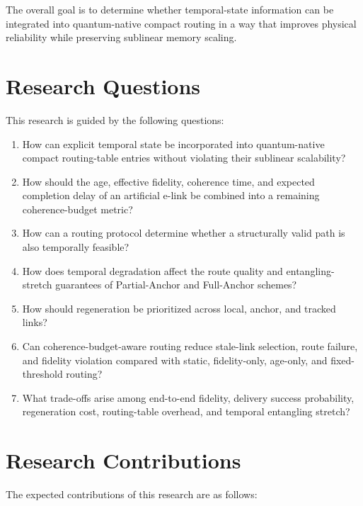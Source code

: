 The overall goal is to determine whether temporal-state information can be integrated into quantum-native compact routing in a way that improves physical reliability while preserving sublinear memory scaling.
\section{Research Questions}
This research is guided by the following questions:

\begin{enumerate}
    \item How can explicit temporal state be incorporated into quantum-native compact routing-table entries without violating their sublinear scalability?

    \item How should the age, effective fidelity, coherence time, and expected completion delay of an artificial e-link be combined into a remaining coherence-budget metric?

    \item How can a routing protocol determine whether a structurally valid path is also temporally feasible?

    \item How does temporal degradation affect the route quality and entangling-stretch guarantees of Partial-Anchor and Full-Anchor schemes?

    \item How should regeneration be prioritized across local, anchor, and tracked links?

    \item Can coherence-budget-aware routing reduce stale-link selection, route failure, and fidelity violation compared with static, fidelity-only, age-only, and fixed-threshold routing?

    \item What trade-offs arise among end-to-end fidelity, delivery success probability, regeneration cost, routing-table overhead, and temporal entangling stretch?
\end{enumerate}
\section{Research Contributions}
The expected contributions of this research are as follows:

